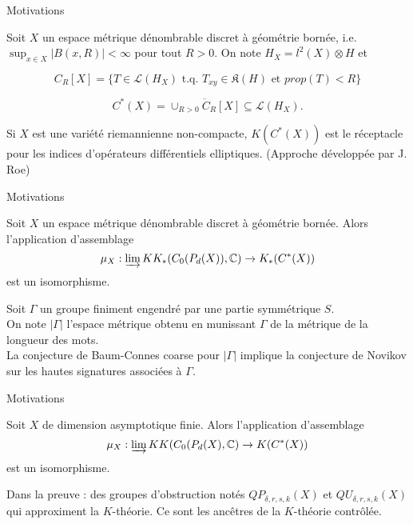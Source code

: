 \begin{frame}{Motivations}

Soit $X$ un espace métrique dénombrable discret à géométrie bornée, i.e. $\sup_{x\in X} |B(x,R)|<\infty$ pour tout $R>0$. On note $H_X = l^2(X)\otimes H$ et 

\[C_R[X] = \{T\in \mathcal L(H_X) \text{ t.q. } T_{xy} \in \mathfrak K(H) \text{ et } prop(T) < R \}\]

\begin{definitionfr}
\[C^*(X) = \overline{\cup_{R>0} C_R[X]} \subseteq \mathcal L(H_X).\]
\end{definitionfr}
\vspace{0.3 cm}
Si $X$ est une variété riemannienne non-compacte, $K(C^*(X))$ est le réceptacle pour les indices d'opérateurs différentiels elliptiques. (Approche développée par J. Roe)
\end{frame}

\begin{frame}{Motivations}
\begin{conj}
Soit $X$ un espace métrique dénombrable discret à géométrie bornée. Alors l'application d'assemblage
\[\mu_X : \varinjlim KK_*(C_0(P_d(X)),\mathbb C) \rightarrow K_*(C^*(X))\]
est un isomorphisme.
\end{conj}

Soit $\Gamma$ un groupe finiment engendré par une partie symmétrique $S$. \\
\vspace{0.3 cm}
On note $|\Gamma|$ l'espace métrique obtenu en munissant $\Gamma$ de la métrique de la longueur des mots. \\
\vspace{0.3 cm}
La conjecture de Baum-Connes coarse pour $|\Gamma |$ implique la conjecture de Novikov sur les hautes signatures associées à $\Gamma$. 
\end{frame}

\begin{frame}{Motivations}

\begin{thmfr}[Yu, 2010 \cite{Yu1}]
Soit $X$ de dimension asymptotique finie. Alors l'application d'assemblage
\[\mu_X : \varinjlim KK(C_0(P_d(X),\mathbb C) \rightarrow K(C^*(X))\]
est un isomorphisme.
\end{thmfr}
\vspace{0.3 cm}
Dans la preuve : des groupes d'obstruction notés $QP_{\delta, r ,s, k}(X)$ et $QU_{\delta, r ,s, k}(X)$ qui approximent la $K$-théorie. Ce sont les ancêtres de la $K$-théorie contrôlée.\\

\end{frame}

